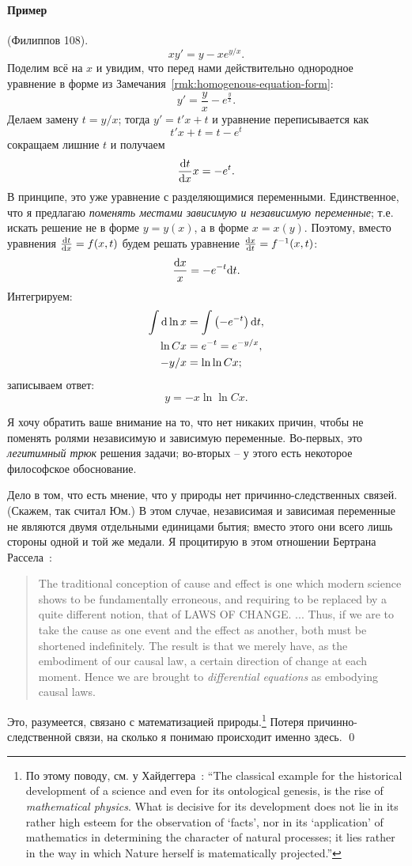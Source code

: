 \documentclass[12pt]{report}
\begin{document}
\paragraph{Пример} (Филиппов 108).
\[
	xy' = y - xe^{y/x}.
\]
Поделим всё на $x$ и увидим, что перед нами действительно однородное уравнение в форме из Замечания~\ref{rmk:homogenous-equation-form}:
\[
	y' = \frac yx - e^{\frac yx}.
\]
Делаем замену $t = y/x$; тогда $y' = t'x + t$ и уравнение переписывается как
\[
	t'x + t = t - e^t
\]
сокращаем лишние $t$ и получаем
\[
	\frac{\mathrm d t}{\mathrm d x}x = - e^t.
\]
В принципе, это уже уравнение с разделяющимися переменными. Единственное, что я предлагаю \emph{поменять местами зависимую и независимую переменные}; т.е. искать решение не в форме $y = y(x)$, а в форме $x = x(y)$. Поэтому, вместо уравнения $\frac{\mathrm d t}{\mathrm d x} = f(x,t)$ будем решать уравнение $\frac{\mathrm d x}{\mathrm d t} = f^{-1}(x,t)$:
\[
	\frac{\mathrm d x}{x} = -e^{-t}\mathrm d t.
\]
Интегрируем:
\begin{align*}
\int \mathrm d\ln x &= \int \left(-e^{-t}\right)\mathrm d t, \\
\ln Cx &= e^{-t} = e^{-y/x}, \\
-y/x &= \ln\ln Cx;
\end{align*}
записываем ответ:
\[
	y = -x\ln\ln Cx.
\]

\begin{rmk}
	Я хочу обратить ваше внимание на то, что нет никаких причин, чтобы не поменять ролями независимую и зависимую переменные. Во-первых, это \emph{легитимный трюк} решения задачи; во-вторых -- у этого есть некоторое философское обоснование. 
	
	Дело в том, что есть мнение, что у природы нет причинно-следственных связей. (Скажем, так считал Юм.) В этом случае, независимая и зависимая переменные не являются двумя отдельными единицами бытия; вместо этого они всего лишь стороны одной и той же медали. Я процитирую в этом отношении Бертрана Рассела~\cite[Lecture V]{Russell}:
	\begin{quote}
		The traditional conception of cause and effect is one which modern science shows to be fundamentally erroneous, and requiring to be replaced by a quite different notion, that of LAWS OF CHANGE. ... Thus, if we are to take the cause as one event and the effect as another, both must be shortened indefinitely. The result is that we merely have, as the embodiment of our causal law, a certain direction of change at each moment. Hence we are brought to \emph{differential equations} as embodying causal laws.
	\end{quote}
	Это, разумеется, связано с математизацией природы.\footnote{По этому поводу, см. у Хайдеггера~\cite[стр.~413--414]{Heidegger}: ``The classical example for the historical development of a science and even for its ontological genesis, is the rise of \emph{mathematical physics}. What is decisive for its development does not lie in its rather high esteem for the observation of `facts', nor in its `application' of mathematics in determining the character of natural processes; it lies rather in the way in which Nature herself is matematically projected.''} Потеря причинно-следственной связи, на сколько я понимаю происходит именно здесь. \qed
\end{rmk}
\end{document}

